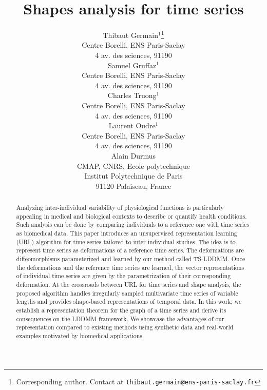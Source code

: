 \documentclass{article}
\title{Shapes analysis for time series}
\author{%
  Thibaut Germain$^1$\thanks{Corresponding author. Contact at \texttt{thibaut.germain@ens-paris-saclay.fr}}\\
  Centre Borelli, ENS Paris-Saclay\\
  4 av. des sciences, 91190 \\
  \And
  Samuel Gruffaz$^1$\\
  Centre Borelli, ENS Paris-Saclay\\
  4 av. des sciences, 91190 \\
  \AND
  Charles Truong$^1$\\
  Centre Borelli, ENS Paris-Saclay\\
  4 av. des sciences, 91190 \\
  \And
  Laurent Oudre$^1$\\
  Centre Borelli, ENS Paris-Saclay\\
  4 av. des sciences, 91190 \\
  \And
  Alain Durmus \\
  CMAP, CNRS, Ecole polytechnique\\
  Institut Polytechnique de Paris\\
  91120 Palaiseau, France \\
}
\begin{document}
\maketitle

\begin{abstract}
Analyzing inter-individual variability of physiological functions is particularly appealing in medical and biological contexts to describe or quantify health conditions. Such analysis can be done by comparing individuals to a reference one with time series as biomedical data.
This paper introduces an unsupervised representation learning (URL) algorithm for time series tailored to inter-individual studies. The idea is to represent time series as deformations of a reference time series. The deformations are diffeomorphisms parameterized and learned by our method called TS-LDDMM. Once the deformations and the reference time series are learned, the vector representations of individual time series are given by the parametrization of their corresponding deformation. At the crossroads between URL for time series and shape analysis, the proposed algorithm handles irregularly sampled multivariate time series of variable lengths and provides shape-based representations of temporal data.
In this work, we establish a representation theorem for the graph of a time series and derive its consequences on the LDDMM framework. We showcase the advantages of our representation compared to existing methods using synthetic data and real-world examples motivated by biomedical applications.
\end{abstract}
\end{document}
